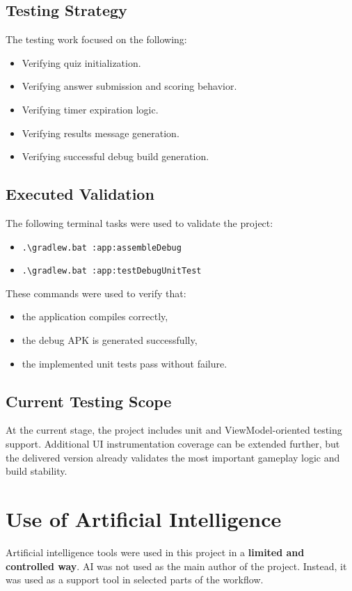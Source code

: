 \documentclass[12pt,a4paper]{article}
\begin{document}
\subsection{Testing Strategy}
The testing work focused on the following:

\begin{itemize}[leftmargin=1.5em]
    \item Verifying quiz initialization.
    \item Verifying answer submission and scoring behavior.
    \item Verifying timer expiration logic.
    \item Verifying results message generation.
    \item Verifying successful debug build generation.
\end{itemize}

\subsection{Executed Validation}
The following terminal tasks were used to validate the project:

\begin{itemize}[leftmargin=1.5em]
    \item \texttt{.\textbackslash gradlew.bat :app:assembleDebug}
    \item \texttt{.\textbackslash gradlew.bat :app:testDebugUnitTest}
\end{itemize}

These commands were used to verify that:

\begin{itemize}[leftmargin=1.5em]
    \item the application compiles correctly,
    \item the debug APK is generated successfully,
    \item the implemented unit tests pass without failure.
\end{itemize}

\subsection{Current Testing Scope}
At the current stage, the project includes unit and ViewModel-oriented testing support. Additional UI instrumentation coverage can be extended further, but the delivered version already validates the most important gameplay logic and build stability.

\section{Use of Artificial Intelligence}
Artificial intelligence tools were used in this project in a \textbf{limited and controlled way}. AI was not used as the main author of the project. Instead, it was used as a support tool in selected parts of the workflow.
\end{document}
